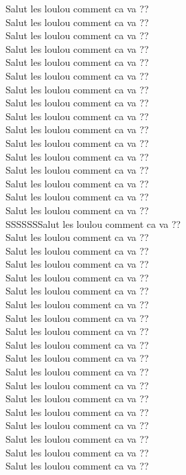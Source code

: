 Salut les loulou comment ca va ??\\
Salut les loulou comment ca va ??\\
Salut les loulou comment ca va ??\\
Salut les loulou comment ca va ??\\
Salut les loulou comment ca va ??\\
Salut les loulou comment ca va ??\\
Salut les loulou comment ca va ??\\
Salut les loulou comment ca va ??\\
Salut les loulou comment ca va ??\\
Salut les loulou comment ca va ??\\
Salut les loulou comment ca va ??\\
Salut les loulou comment ca va ??\\
Salut les loulou comment ca va ??\\
Salut les loulou comment ca va ??\\
Salut les loulou comment ca va ??\\
Salut les loulou comment ca va ??\\
SSSSSSSalut les loulou comment ca va ??\\
Salut les loulou comment ca va ??\\
Salut les loulou comment ca va ??\\
Salut les loulou comment ca va ??\\
Salut les loulou comment ca va ??\\
Salut les loulou comment ca va ??\\
Salut les loulou comment ca va ??\\
Salut les loulou comment ca va ??\\
Salut les loulou comment ca va ??\\
Salut les loulou comment ca va ??\\
Salut les loulou comment ca va ??\\
Salut les loulou comment ca va ??\\
Salut les loulou comment ca va ??\\
Salut les loulou comment ca va ??\\
Salut les loulou comment ca va ??\\
Salut les loulou comment ca va ??\\
Salut les loulou comment ca va ??\\
Salut les loulou comment ca va ??\\
Salut les loulou comment ca va ??\\
